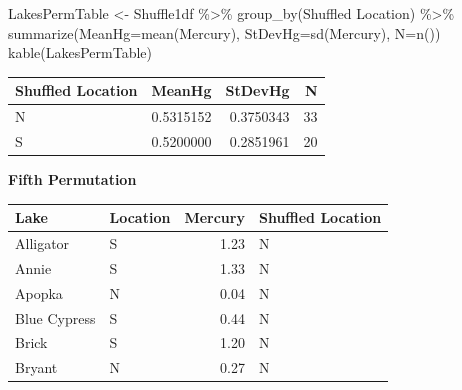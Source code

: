 \documentclass[
  letterpaper,
  DIV=11,
  numbers=noendperiod]{scrreprt}
\newenvironment{Shaded}{\begin{snugshade}}{\end{snugshade}}
\newcommand{\AttributeTok}[1]{\textcolor[rgb]{0.40,0.45,0.13}{#1}}
\newcommand{\DecValTok}[1]{\textcolor[rgb]{0.68,0.00,0.00}{#1}}
\newcommand{\DocumentationTok}[1]{\textcolor[rgb]{0.37,0.37,0.37}{\textit{#1}}}
\newcommand{\FunctionTok}[1]{\textcolor[rgb]{0.28,0.35,0.67}{#1}}
\newcommand{\NormalTok}[1]{\textcolor[rgb]{0.00,0.23,0.31}{#1}}
\newcommand{\OtherTok}[1]{\textcolor[rgb]{0.00,0.23,0.31}{#1}}
\newcommand{\SpecialCharTok}[1]{\textcolor[rgb]{0.37,0.37,0.37}{#1}}
\newcommand{\StringTok}[1]{\textcolor[rgb]{0.13,0.47,0.30}{#1}}
\begin{document}
\begin{Shaded}
\begin{Highlighting}[]
\NormalTok{LakesPermTable }\OtherTok{\textless{}{-}}\NormalTok{ Shuffle1df }\SpecialCharTok{\%\textgreater{}\%} \FunctionTok{group\_by}\NormalTok{(}\StringTok{\textasciigrave{}}\AttributeTok{Shuffled Location}\StringTok{\textasciigrave{}}\NormalTok{) }\SpecialCharTok{\%\textgreater{}\%} \FunctionTok{summarize}\NormalTok{(}\AttributeTok{MeanHg=}\FunctionTok{mean}\NormalTok{(Mercury), }\AttributeTok{StDevHg=}\FunctionTok{sd}\NormalTok{(Mercury),  }\AttributeTok{N=}\FunctionTok{n}\NormalTok{())}
\FunctionTok{kable}\NormalTok{(LakesPermTable)}
\end{Highlighting}
\end{Shaded}

\begin{longtable}[]{@{}lrrr@{}}
\toprule\noalign{}
Shuffled Location & MeanHg & StDevHg & N \\
\midrule\noalign{}
\endhead
\bottomrule\noalign{}
\endlastfoot
N & 0.5315152 & 0.3750343 & 33 \\
S & 0.5200000 & 0.2851961 & 20 \\
\end{longtable}

\textbf{Fifth Permutation}

\begin{Shaded}
\end{Shaded}

\begin{longtable}[]{@{}llrl@{}}
\toprule\noalign{}
Lake & Location & Mercury & Shuffled Location \\
\midrule\noalign{}
\endhead
\bottomrule\noalign{}
\endlastfoot
Alligator & S & 1.23 & N \\
Annie & S & 1.33 & N \\
Apopka & N & 0.04 & N \\
Blue Cypress & S & 0.44 & N \\
Brick & S & 1.20 & N \\
Bryant & N & 0.27 & N \\
\end{longtable}
\end{document}
